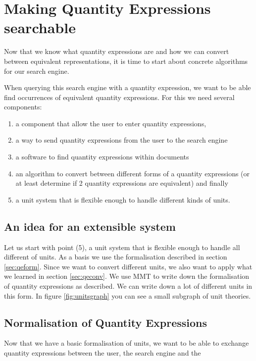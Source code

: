 \section{Making Quantity Expressions searchable}
Now that we know what quantity expressions are and how we can convert between equivalent representations, it is time to start about concrete algorithms for our search engine.

When querying this search engine with a quantity expression, we want to be able find occurrences of equivalent quantity expressions. For this we need several components:
\begin{enumerate}
  \item a component that allow the user to enter quantity expressions,
  \item a way to send quantity expressions from the user to the search engine
  \item a software to find quantity expressions within documents
  \item an algorithm to convert between different forms of a quantity expressions (or at least determine if 2 quantity expressions are equivalent) and finally
  \item a unit system that is flexible enough to handle different kinds of units.
\end{enumerate}

\subsection{An idea for an extensible system}
\label{sec:meq_model}

Let us start with point (5), a unit system that is flexible enough to handle all different of units. As a basis we use the formalisation described in section \ref{sec:qeform}. Since we want to convert different units, we also want to apply what we learned in section \ref{sec:qeconv}. We use MMT to write down the formalisation of quantity expressions as described. We can write down a lot of different units in this form. In figure \ref{fig:unitsgraph} you can see a small subgraph of unit theories.




\subsection{Normalisation of Quantity Expressions}

Now that we have a basic formalisation of units, we want to be able to exchange quantity expressions between the user, the search engine and the


